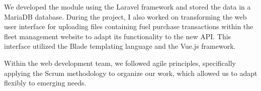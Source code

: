 We developed the module using the Laravel framework and stored the data in a MariaDB database. During the project, I also worked on transforming the web user interface for uploading files containing fuel purchase transactions within the fleet management website to adapt its functionality to the new API. This interface utilized the Blade templating language and the Vue.js framework.

Within the web development team, we followed agile principles, specifically applying the Scrum methodology to organize our work, which allowed us to adapt flexibly to emerging needs.
